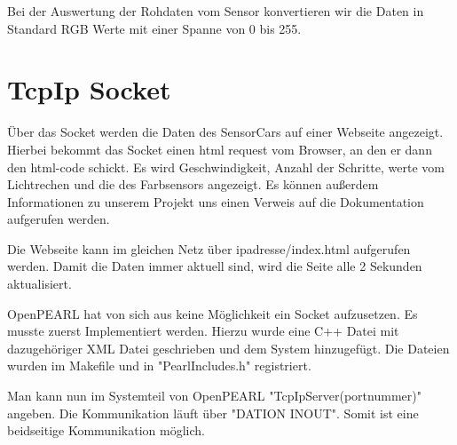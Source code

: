 Bei der Auswertung der Rohdaten vom Sensor konvertieren wir die Daten in Standard RGB Werte mit einer Spanne von 0 bis 255.

\section{TcpIp Socket}
Über das Socket werden die Daten des SensorCars auf einer Webseite angezeigt. Hierbei bekommt das Socket einen html request vom Browser, an den er dann den html-code schickt. Es wird Geschwindigkeit, Anzahl der Schritte, werte vom Lichtrechen und die des Farbsensors angezeigt. Es können außerdem Informationen zu unserem Projekt uns einen Verweis auf die Dokumentation aufgerufen werden. 

Die Webseite kann im gleichen Netz über ipadresse/index.html aufgerufen werden. Damit die Daten immer aktuell sind, wird die Seite alle 2 Sekunden aktualisiert.

OpenPEARL hat von sich aus keine Möglichkeit ein Socket aufzusetzen. Es musste zuerst Implementiert werden. Hierzu wurde eine C++ Datei mit dazugehöriger XML Datei geschrieben und dem System hinzugefügt. Die Dateien wurden im Makefile und in "PearlIncludes.h" registriert. 

Man kann nun im Systemteil von OpenPEARL "TcpIpServer(portnummer)" angeben. Die Kommunikation läuft über "DATION INOUT". Somit ist eine beidseitige Kommunikation möglich. 
